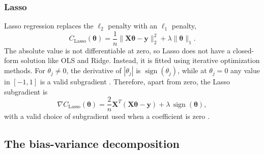 \documentclass[amssymb,twocolumn,aps]{revtex4}
\begin{document}
\subsubsection{Lasso}
Lasso regression replaces the $\ell_2$ penalty with an $\ell_1$ penalty,
\[
    C_{\mathrm{Lasso}}(\boldsymbol{\theta})
    =
    \frac{1}{n}\|\boldsymbol{X}\boldsymbol{\theta}-\mathbf{\boldsymbol{y}}\|_2^2
    +\lambda\|\boldsymbol{\theta}\|_1.
\]
The absolute value is not differentiable at zero, so Lasso does not have a closed-form solution like OLS and Ridge. Instead, it is fitted using iterative optimization methods. For $\theta_j\neq0$, the derivative of $|\theta_j|$ is $\operatorname{sign}(\theta_j)$, while at $\theta_j=0$ any value in $[-1,1]$ is a valid subgradient \cite{lecturebook}. Therefore, apart from zero, the Lasso subgradient is
\begin{equation}
    \nabla C_{\mathrm{Lasso}}(\boldsymbol{\theta})
    =
    \frac{2}{n}\boldsymbol{X}^T
    (\boldsymbol{X}\boldsymbol{\theta}-\mathbf{\boldsymbol{y}})
    +
    \lambda\,\operatorname{sign}(\boldsymbol{\theta}), \label{eq:gradient_lasso}
\end{equation}
with a valid choice of subgradient used when a coefficient is zero \cite{lecturebook}.

\subsection{The bias-variance decomposition}
\end{document}
